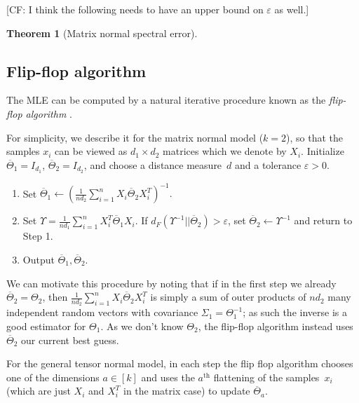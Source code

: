 \documentclass[aos]{imsart}
\newtheorem{theorem}{Theorem}[section]
\theoremstyle{definition}
\numberwithin{equation}{section}
\newcommand{\htheta}{\widehat{\Theta}}
\newcommand{\eps}{\varepsilon}
\newcommand{\samp}{x}
\newcommand{\CF}[1]{{\color{purple}[CF: #1]}}
\begin{document}
\CF{I think the following needs to have an upper bound on $\eps$ as well.}
\begin{theorem}[Matrix normal spectral error]\label{thm:matrix-normal}
\MatrixSpec
\end{theorem}

\subsection{Flip-flop algorithm}
The MLE can be computed by a natural iterative procedure known as the \emph{flip-flop algorithm} \citep{dutilleul1999mle,gurvits2004classical}.

For simplicity, we describe it for the matrix normal model ($k=2$), so that the samples $\samp_i$ can be viewed as $d_1\times d_2$ matrices which we denote by $X_i$.
Initialize $\overline{\Theta}_1 = I_{d_1}$, $\overline{\Theta}_2 = I_{d_2}$, and choose a distance measure~$d$ and a tolerance $\eps > 0$.
\begin{enumerate}
\item Set $\overline{\Theta}_1 \leftarrow (\frac{1}{n d_2} \sum_{i = 1}^n X_i \overline{\Theta}_2 X_i^T)^{-1}.$
\item\label{it:sinkhorn second} Set $\Upsilon = \frac{1}{n d_1} \sum_{i = 1}^n X_i^T \overline{\Theta}_1 X_i$.
If $d_F( \Upsilon^{-1}|| \overline{\Theta}_2) > \eps$, set $\overline{\Theta}_2 \leftarrow \Upsilon^{-1}$ and return to Step 1.
\item Output $\overline{\Theta}_1, \overline{\Theta}_2$.
\end{enumerate}

We can motivate this procedure by noting that if in the first step we already $\overline{\Theta}_2 = \Theta_2$, then $\frac{1}{n d_2} \sum_{i = 1}^n X_i \overline{\Theta}_2 X_i^T$ is simply a sum of outer products of $nd_2$ many independent random vectors with covariance $\Sigma_1 = \Theta_1^{-1}$; as such the inverse is a good estimator for $\Theta_1$.
As we don't know $\Theta_2$, the flip-flop algorithm instead uses $\overline{\Theta}_2$ our current best guess.

For the general tensor normal model, in each step the flip flop algorithm chooses one of the dimensions $a \in [k]$ and uses the $a^\text{th}$ flattening of the samples~$x_i$ (which are just $X_i$ and $X_i^T$ in the matrix case) to update $\overline{\Theta}_a$.
\end{document}

